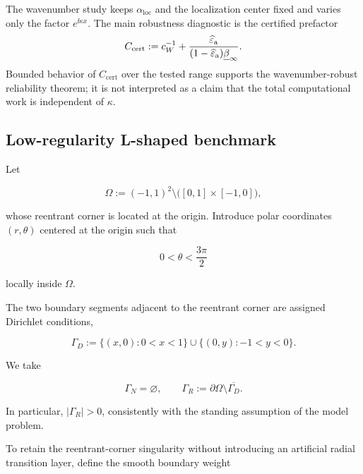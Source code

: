 The wavenumber study keeps $\alpha_{\mathrm{loc}}$ and the localization
center fixed and varies only the factor $e^{\ii\kappa x}$.  The main
robustness diagnostic is the certified prefactor
\begin{equation}
\label{eq:numerical-certified-prefactor}
  C_{\mathrm{cert}}
  :=c_W^{-1}
    +\frac{\widehat\varepsilon_{\mathrm a}}{(1-\widehat\varepsilon_{\mathrm a})\underline\beta_\infty}.
\end{equation}
Bounded behavior of $C_{\mathrm{cert}}$ over the tested range supports the
wavenumber-robust reliability theorem; it is not interpreted as a claim
that the total computational work is independent of $\kappa$.


\subsection{Low-regularity L-shaped benchmark}

\label{sec:num-lshape}


Let

\begin{equation}
\label{eq:lshape-domain}
  \Omega
  :=
  (-1,1)^2
  \setminus
  \bigl([0,1]\times[-1,0]\bigr),
\end{equation}

whose reentrant corner is located at the origin. Introduce polar
coordinates $(r,\theta)$ centered at the origin such that

\[
  0<\theta<\frac{3\pi}{2}
\]

locally inside $\Omega$.

The two boundary segments adjacent to the reentrant corner are assigned
Dirichlet conditions,

\begin{equation}
\label{eq:lshape-GammaD}
  \Gamma_D
  :=
  \{(x,0):0<x<1\}
  \cup
  \{(0,y):-1<y<0\}.
\end{equation}

We take

\begin{equation}
\label{eq:lshape-boundary-partition}
  \Gamma_N=\varnothing,
  \qquad
  \Gamma_R
  :=
  \partial\Omega\setminus\overline{\Gamma_D}.
\end{equation}

In particular, $|\Gamma_R|>0$, consistently with the standing assumption
of the model problem.

To retain the reentrant-corner singularity without introducing an
artificial radial transition layer, define the smooth boundary weight

